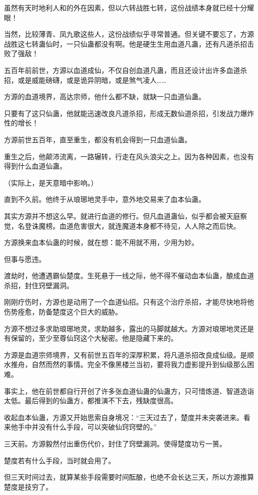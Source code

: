 \begin{this_body}
虽然有天时地利人和的外在因素，但以六转战胜七转，这份战绩本身就已经十分耀眼！

当然，比较薄青、凤九歌这些人，这份战绩似乎寻常普通。但关键不要忘了，方源战胜这七转蛊仙时，一只仙蛊都没有啊。他是硬生生用血道凡蛊，还有凡道杀招击败了强敌！

五百年前前世，方源以血道成仙，不仅自创血道凡蛊，而且还设计出许多血道杀招，或是威能磅礴，或是诡异阴暗，或是煞气凌人……

方源的血道境界，高达宗师，他什么都不缺，就缺一只血道仙蛊。

只要有了这只仙蛊，他就能迅速改良凡道杀招，形成无数仙道杀招，引发战力爆炸性的增长！

方源前世五百年，直至重生，都没有机会得到一只血道仙蛊。

重生之后，他颠沛流离，一路辗转，行走在风头浪尖之上。因为各种因素，也没有得到什么血道仙蛊。

（实际上，是天意暗中影响。）

直到不久前。他终于从琅琊地灵手中，意外地交易来了血本仙蛊。

其实方源并不想这么早。就进行血道的修行。但凡血道蛊仙，似乎都会被天庭察觉，名登诛魔榜。血道危害很大，就连魔道本身都不待见，人人除之而后快。

方源换来血本仙蛊的时候，就在想：能不用就不用，少用为妙。

但事与愿违。

渡劫时，他遭遇霸仙楚度。生死悬于一线之际，他不得不催动血本仙蛊，酿成血道杀招，封住窍壁漏洞。

刚刚疗伤时，方源也是动用了一个血道仙招。只有这个治疗杀招，才能尽快地将他伤势痊愈，防备楚度这个巨大的威胁。

方源不想过多求助琅琊地灵，求助越多，露出的马脚就越大。方源对琅琊地灵还是有保留的，至少至尊仙窍这个大秘密。他是隐藏下来的。

方源是血道宗师境界，又有前世五百年的深厚积累，将凡道杀招改良成仙级。是顺水推舟，自然而然的事情。完全不像黑楼兰当初，要将我力虚影提升到仙级那么困难。

事实上，他在前世都自行开创了许多张血道仙蛊的仙蛊方，只可惜炼道、智道造诣太低。最后得到的仙蛊方，都推演不下去，残缺度很高。

收起血本仙蛊，方源又开始思索自身境况：“三天过去了，楚度并未突袭进来。看来他手中并没有什么手段，可以突破仙窍窍壁的。”

三天前。方源毅然付出重伤代价，封住了窍壁漏洞。使得楚度功亏一篑。

楚度若有什么手段，当时就会用了。

但三天时间过去，就算某些手段需要时间酝酿，也绝不会长达三天，所以方源推算楚度是技穷了。


\end{this_body}
